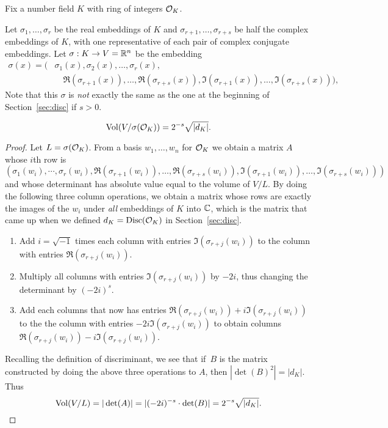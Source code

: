 Fix a number field $K$ with ring of integers $\mathcal{O}_K$. 

Let $\sigma_1,\ldots, \sigma_r$ be the real embeddings
of $K$ and $\sigma_{r+1},\ldots, \sigma_{r+s}$ be half
the complex embeddings of $K$, with one representative of
each pair of complex conjugate embeddings.
Let $\sigma:K \to V=\mathbb{R}^n$ be the embedding 
\begin{align*}
  \sigma(x) = \big(&\sigma_1(x), \sigma_2(x),\ldots, \sigma_r(x),\\
     &\quad \Re(\sigma_{r+1}(x)), \ldots, \Re(\sigma_{r+s}(x)), 
      \Im(\sigma_{r+1}(x)), \ldots, \Im(\sigma_{r+s}(x))\big),
\end{align*}
Note that this $\sigma$ is {\em not} exactly the same as the one
at the beginning of Section~\ref{sec:disc} if $s>0$. 

\begin{lemma}\label{lem:volok}
\[
  \operatorname{Vol}(V/\sigma(\mathcal{O}_K)) = 2^{-s} \sqrt{|d_K|}.
\]
\end{lemma}
\begin{proof}
Let $L=\sigma(\mathcal{O}_K)$.
From a basis $w_1,\ldots, w_n$ for $\mathcal{O}_K$ we obtain a matrix $A$
whose $i$th row is
\[
(\sigma_1(w_i), \cdots, \sigma_r(w_i), 
\Re(\sigma_{r+1}(w_i)),\ldots, \Re(\sigma_{r+s}(w_i)), 
\Im(\sigma_{r+1}(w_i)),\ldots, \Im(\sigma_{r+s}(w_i)))
\]
and whose determinant has absolute value equal to the volume
of $V/L$.  By doing the following three column operations,
we obtain a matrix whose rows are exactly the images of
the $w_i$ under {\em all} embeddings of $K$ into $\mathbb{C}$, which
is the matrix that came up when we defined 
$d_K=\operatorname{Disc}(\mathcal{O}_K)$ in Section~\ref{sec:disc}.
\begin{enumerate}
\item Add $i=\sqrt{-1}$ times each column with entries $\Im(\sigma_{r+j}(w_i))$
to the column with entries $\Re(\sigma_{r+j}(w_i))$.
\item Multiply all columns with entries $\Im(\sigma_{r+j}(w_i))$
  by $-2i$, thus changing the determinant by $(-2i)^s$.
\item Add each columns that now has entries 
$\Re(\sigma_{r+j}(w_i))+i\Im(\sigma_{r+j}(w_i))$
to the the column with entries $-2i\Im(\sigma_{r+j}(w_i))$
to obtain columns $\Re(\sigma_{r+j}(w_i))-i\Im(\sigma_{r+j}(w_i))$.
\end{enumerate}
Recalling the definition of discriminant, we see that if~$B$ 
is the matrix constructed by doing the above three
operations to $A$, then $|\det(B)^2| = |d_K|$. 
Thus
\[
  \operatorname{Vol}(V/L) = |\det(A)| = |(-2i)^{-s}\cdot \det(B)| = 2^{-s}\sqrt{|d_K|}.
\]
\end{proof}

